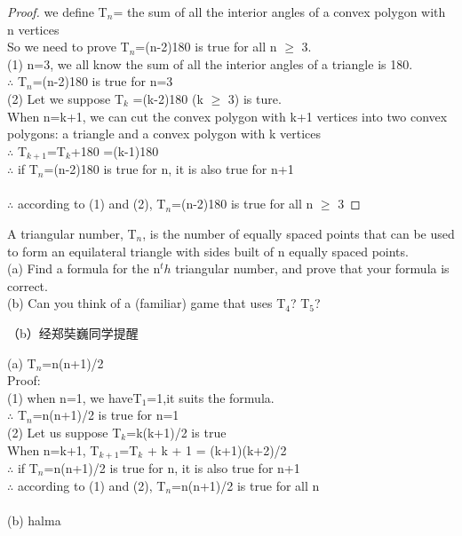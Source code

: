 \documentclass[11pt, a4paper, UTF8]{ctexart}
\begin{document}
\begin{proof}
we define T$_n$= the sum of all the interior angles of a convex polygon with n vertices \\
So we need to prove T$_n$=(n-2)180 is true for all n $\ge$ 3.\\
(1) n=3, we all know the sum of all the interior angles of a triangle is 180.\\
$\therefore$ T$_n$=(n-2)180 is true for n=3\\

(2) Let we suppose T$_k$ =(k-2)180 (k $\ge$ 3) is ture.\\
When n=k+1, we can cut the convex polygon with k+1 vertices into two convex polygons: a triangle and a convex polygon with k vertices\\
$\therefore$ T$_{k+1}$=T$_k$+180 =(k-1)180\\
$\therefore$ if T$_n$=(n-2)180 is true for n, it is also true for n+1\\
\\
$\therefore$ according to (1) and (2), T$_n$=(n-2)180 is true for all n $\ge$ 3
\end{proof}


\begin{problem}[UD:17.18]
A triangular number, T$_n$, is the number of equally spaced points that can be used to form an equilateral triangle with sides built of n equally spaced points. \\
(a) Find a formula for the n$^th$ triangular number, and prove that your formula is correct.\\
(b) Can you think of a (familiar) game that uses T$_4$? T$_5$?
\end{problem}

\begin{remark}
（b）经郑奘巍同学提醒
\end{remark}

\begin{solution}
(a) T$_n$=n(n+1)/2\\
Proof:\\
(1) when n=1, we haveT$_1$=1,it suits the formula.\\
$\therefore$ T$_n$=n(n+1)/2 is true for n=1\\
(2) Let us suppose T$_k$=k(k+1)/2 is true\\
When n=k+1, T$_{k+1}$=T$_k$ + k + 1 = (k+1)(k+2)/2\\
$\therefore$ if T$_n$=n(n+1)/2 is true for n, it is also true for n+1\\
$\therefore$ according to (1) and (2), T$_n$=n(n+1)/2 is true for all n\\
\\
(b) halma\\
\end{solution}
\end{document}
